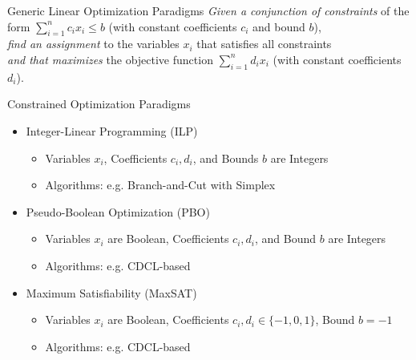 \documentclass[t,english]{sdqbeamer}
\begin{document}
\begin{frame}{Generic Linear Optimization Paradigms}
\vspace{-2em}
\emph{Given a conjunction of constraints} of the form $\sum\limits_{i=1}^n c_i x_i \leq b$ (with constant coefficients $c_i$ and bound $b$),\\
\emph{find an assignment} to the variables $x_i$ that satisfies all constraints\\
\emph{and that maximizes} the objective function $\sum\limits_{i=1}^n d_i x_i$ (with constant coefficients $d_i$).~\\[1em]
\begin{block}{Constrained Optimization Paradigms}
\begin{itemize}\itemsep1em
	\item Integer-Linear Programming (ILP)
	\begin{itemize}\itemsep1ex
		\item Variables $x_i$, Coefficients $c_i, d_i$, and Bounds $b$ are Integers
		\item Algorithms: e.g. Branch-and-Cut with Simplex
	\end{itemize}
	\item Pseudo-Boolean Optimization (PBO)
	\begin{itemize}\itemsep1ex
		\item Variables $x_i$ are Boolean, Coefficients $c_i, d_i$, and Bound $b$ are Integers
		\item Algorithms: e.g. CDCL-based
	\end{itemize}
	\item Maximum Satisfiability (MaxSAT)
	\begin{itemize}\itemsep1ex
		\item Variables $x_i$ are Boolean, Coefficients $c_i, d_i \in \{-1, 0, 1\}$, Bound $b=-1$
		\item Algorithms: e.g. CDCL-based
	\end{itemize}
\end{itemize}
\end{block}
\end{frame}
\end{document}
